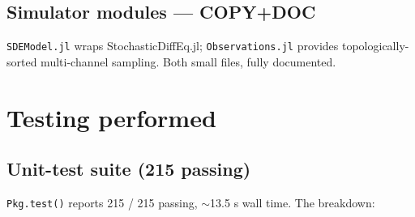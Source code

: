 \documentclass[11pt,a4paper]{article}
\begin{document}
\subsection{Simulator modules --- COPY+DOC}
\texttt{SDEModel.jl} wraps StochasticDiffEq.jl;
\texttt{Observations.jl} provides topologically-sorted multi-channel
sampling. Both small files, fully documented.

\section{Testing performed}
\label{sec:tests}

\subsection{Unit-test suite (215 passing)}
\texttt{Pkg.test()} reports 215 / 215 passing, $\sim$13.5 s wall time.
The breakdown:
\end{document}
